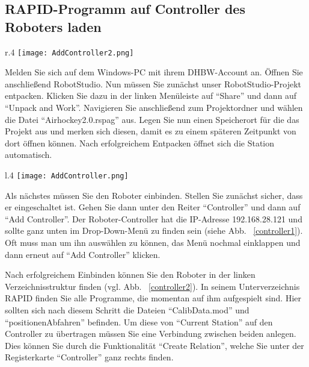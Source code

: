 \subsection{RAPID-Programm auf Controller des Roboters laden}

\begin{wrapfigure}{r}{.4\textwidth}
\centering
\texttt{[image: AddController2.png]}
\vspace{-15pt}
\caption{Controller hinzufügen} 
\label{controller1}
\end{wrapfigure}

Melden Sie sich auf dem Windows-PC mit ihrem DHBW-Account an. Öffnen Sie anschließend RobotStudio. Nun müssen Sie zunächst unser RobotStudio-Projekt entpacken. Klicken Sie dazu in der linken Menüleiste auf \enquote{Share} und dann auf \enquote{Unpack and Work}. Navigieren Sie anschließend zum Projektordner und wählen die Datei \enquote{Airhockey2.0.rspag} aus. Legen Sie nun einen Speicherort für die das Projekt aus und merken sich diesen, damit es zu einem späteren Zeitpunkt von dort öffnen können. Nach erfolgreichem Entpacken öffnet sich die Station automatisch. 

\begin{wrapfigure}{l}{.4\textwidth}
\centering
\texttt{[image: AddController.png]}
\vspace{-15pt}
\caption{Verzeichnisstruktur} 
\label{controller2}
\end{wrapfigure}

Als nächstes müssen Sie den Roboter einbinden. Stellen Sie zunächst sicher, dass er eingeschaltet ist. Gehen Sie dann unter den Reiter \enquote{Controller} und dann auf \enquote{Add Controller}. Der Roboter-Controller hat die IP-Adresse 192.168.28.121 und sollte ganz unten im Drop-Down-Menü zu finden sein (siehe Abb. ~\ref{controller1}). Oft muss man um ihn auswählen zu können, das Menü nochmal einklappen und dann erneut auf \enquote{Add Controller} klicken. 

Nach erfolgreichem Einbinden können Sie den Roboter in der linken Verzeichnisstruktur finden (vgl. Abb. ~\ref{controller2}). In seinem Unterverzeichnis RAPID finden Sie alle Programme, die momentan auf ihm aufgespielt sind. Hier sollten sich nach diesem Schritt die Dateien \enquote{CalibData.mod} und \enquote{positionenAbfahren} befinden. Um diese von \enquote{Current Station} auf den Controller zu übertragen müssen Sie eine Verbindung zwischen beiden anlegen. Dies können Sie durch die Funktionalität \enquote{Create Relation}, welche Sie unter der Registerkarte \enquote{Controller} ganz rechts finden.

